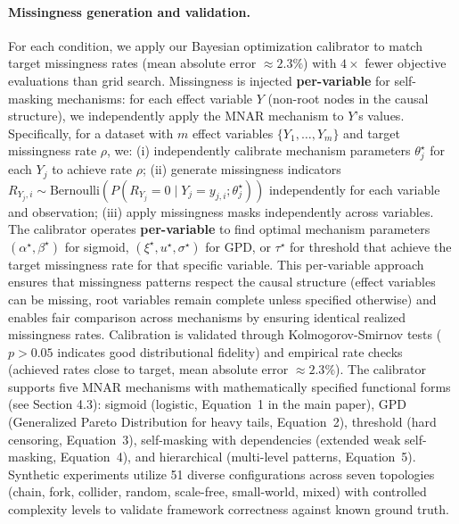 \documentclass[runningheads]{llncs}
\begin{document}
\paragraph{Missingness generation and validation.}
For each condition, we apply our Bayesian optimization calibrator to match target missingness rates (mean absolute error $\approx2.3\%$) with $4\times$ fewer objective evaluations than grid search. Missingness is injected \textbf{per-variable} for self-masking mechanisms: for each effect variable $Y$ (non-root nodes in the causal structure), we independently apply the MNAR mechanism to $Y$'s values. Specifically, for a dataset with $m$ effect variables $\{Y_1, \ldots, Y_m\}$ and target missingness rate $\rho$, we: (i) independently calibrate mechanism parameters $\theta_j^\star$ for each $Y_j$ to achieve rate $\rho$; (ii) generate missingness indicators $R_{Y_j,i} \sim \mathrm{Bernoulli}(P(R_{Y_j}=0 \mid Y_j=y_{j,i}; \theta_j^\star))$ independently for each variable and observation; (iii) apply missingness masks independently across variables. The calibrator operates \textbf{per-variable} to find optimal mechanism parameters $(\alpha^\star, \beta^\star)$ for sigmoid, $(\xi^\star, u^\star, \sigma^\star)$ for GPD, or $\tau^\star$ for threshold that achieve the target missingness rate for that specific variable. This per-variable approach ensures that missingness patterns respect the causal structure (effect variables can be missing, root variables remain complete unless specified otherwise) and enables fair comparison across mechanisms by ensuring identical realized missingness rates. Calibration is validated through Kolmogorov-Smirnov tests ($p>0.05$ indicates good distributional fidelity) and empirical rate checks (achieved rates close to target, mean absolute error $\approx2.3\%$). The calibrator supports five MNAR mechanisms with mathematically specified functional forms (see Section 4.3): sigmoid (logistic, Equation~1 in the main paper), GPD (Generalized Pareto Distribution for heavy tails, Equation~2), threshold (hard censoring, Equation~3), self-masking with dependencies (extended weak self-masking, Equation~4), and hierarchical (multi-level patterns, Equation~5). Synthetic experiments utilize 51 diverse configurations across seven topologies (chain, fork, collider, random, scale-free, small-world, mixed) with controlled complexity levels to validate framework correctness against known ground truth.
\end{document}
